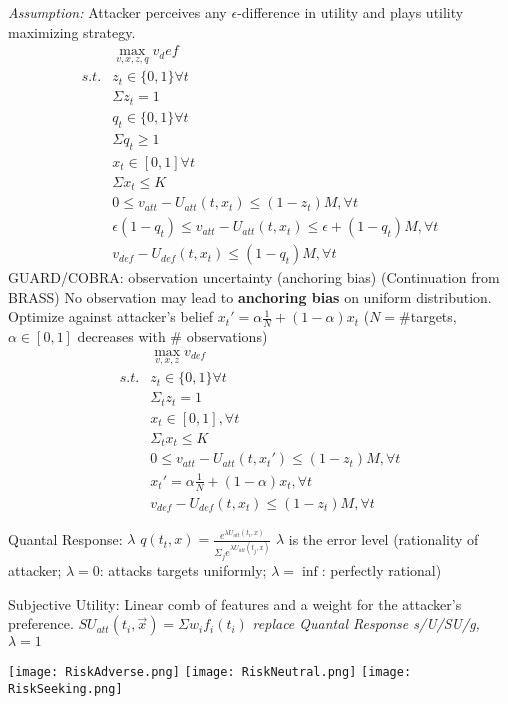 \documentclass[10pt,letter]{article}
\begin{document}
\begin{multicols}{2}
\textit{Assumption:} Attacker perceives any $\epsilon$-difference in utility and
plays utility maximizing strategy.
\begin{align*}
    &\max_{v,x,z,q}v_def\\
    s.t.&z_t\in\{0,1\}\forall t\\
    &\Sigma z_t = 1\\
    &q_t\in\{0,1\}\forall t\\
    &\Sigma q_t\geq 1\\
    &x_t\in[0,1]\forall t\\
    &\Sigma x_t\leq K\\
    &0\leq v_{att}-U_{att}(t,x_t)\leq(1-z_t)M,\forall t\\
    &\epsilon(1-q_t)\leq v_{att} - U_{att}(t,x_t)\leq\epsilon + (1-q_t)M,\forall t\\
    &v_{def} - U_{def}(t,x_t)\leq(1-q_t)M,\forall t
\end{align*}
GUARD/COBRA: observation uncertainty (anchoring bias) (Continuation from BRASS)
No observation may lead to \textbf{anchoring bias} on uniform distribution.
Optimize against attacker's belief $x_t'=\alpha\frac{1}{N}+(1-\alpha)x_t$ 
($N=$\#targets, $\alpha\in [0,1]$ decreases with \# observations)
\begin{align*}
    &\max_{v,x,z} v_{def}\\
    s.t.& z_t\in\{0,1\}\forall t\\
    &\Sigma_t z_t = 1\\
    &x_t \in [0,1], \forall t\\
    &\Sigma_t x_t \leq K\\
    &0\leq v_{att} - U_{att}(t,x_t')\leq (1-z_t) M,\forall t\\
    &x_t' = \alpha \frac1N + (1-\alpha) x_t, \forall t\\
    &v_{def} - U_{def}(t,x_t) \leq (1-z_t) M, \forall t
\end{align*}

Quantal Response: $\lambda$
$q(t_t,x) = \frac{e^{\lambda U_{att}(t_i,x)}}{\Sigma_j e^{\lambda U_{att}(t_j,x)}}$
$\lambda$ is the error level (rationality of attacker; $\lambda=0$: attacks
targets uniformly; $\lambda=\inf$: perfectly rational)

Subjective Utility: Linear comb of features and a weight for the attacker's
preference. $SU_{att}(t_i,\vec{x}) = \Sigma w_if_i(t_i)$ \textit{replace Quantal
Response s/U/SU/g, $\lambda=1$}

\texttt{[image: RiskAdverse.png]}
\texttt{[image: RiskNeutral.png]}
\texttt{[image: RiskSeeking.png]}


\end{multicols}
\end{document}
